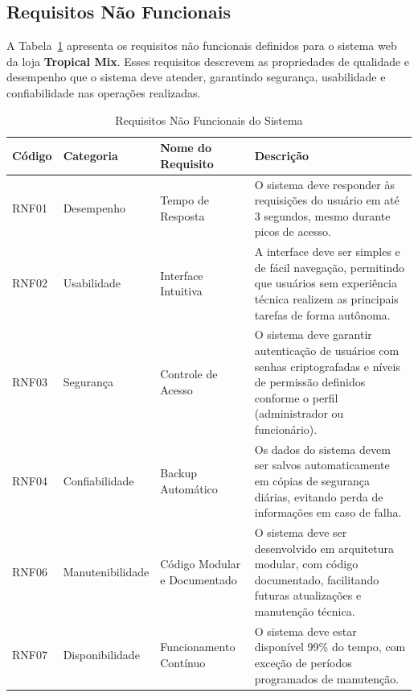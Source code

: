 \vspace{-0.5cm}

\subsection{Requisitos Não Funcionais}

A Tabela~\ref{tab:requisitos-nao-funcionais} apresenta os requisitos não funcionais definidos para o sistema web da loja \textbf{Tropical Mix}. Esses requisitos descrevem as propriedades de qualidade e desempenho que o sistema deve atender, garantindo segurança, usabilidade e confiabilidade nas operações realizadas.

\begin{table}[H]
\centering
\caption{Requisitos Não Funcionais do Sistema}
\label{tab:requisitos-nao-funcionais}
\begin{tabular}{|p{2cm}|p{3cm}|p{4cm}|p{6.5cm}|}
\hline
\textbf{Código} & \textbf{Categoria} & \textbf{Nome do Requisito} & \textbf{Descrição} \\ \hline

RNF01 & Desempenho & Tempo de Resposta & 
O sistema deve responder às requisições do usuário em até 3 segundos, mesmo durante picos de acesso. \\ \hline

RNF02 & Usabilidade & Interface Intuitiva & 
A interface deve ser simples e de fácil navegação, permitindo que usuários sem experiência técnica realizem as principais tarefas de forma autônoma. \\ \hline

RNF03 & Segurança & Controle de Acesso & 
O sistema deve garantir autenticação de usuários com senhas criptografadas e níveis de permissão definidos conforme o perfil (administrador ou funcionário). \\ \hline

RNF04 & Confiabilidade & Backup Automático & 
Os dados do sistema devem ser salvos automaticamente em cópias de segurança diárias, evitando perda de informações em caso de falha. \\ \hline

RNF06 & Manutenibilidade & Código Modular e Documentado & 
O sistema deve ser desenvolvido em arquitetura modular, com código documentado, facilitando futuras atualizações e manutenção técnica. \\ \hline

RNF07 & Disponibilidade & Funcionamento Contínuo & 
O sistema deve estar disponível 99\% do tempo, com exceção de períodos programados de manutenção. \\ \hline

\end{tabular}
\end{table}

